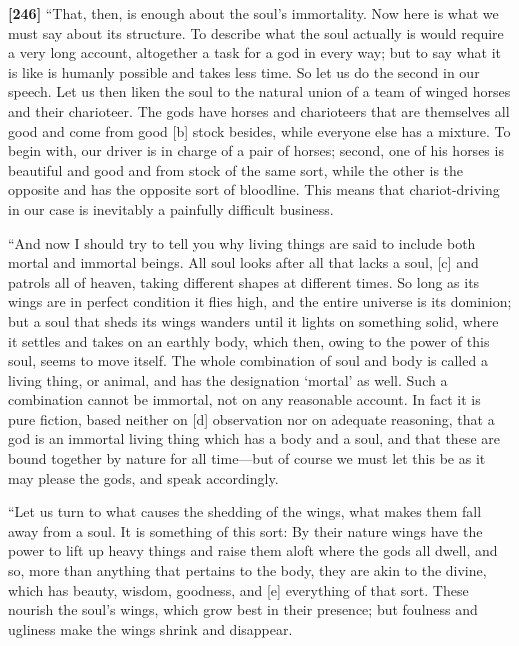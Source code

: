 {\bf {[}246{]}} “That, then, is enough about the soul's immortality. Now
here is what we must say about its structure. To describe what the soul
actually is would require a very long account, altogether a task for a
god in every way; but to say what it is like is humanly possible and
takes less time. So let us do the second in our speech. Let us then
liken the soul to the natural union of a team of winged horses and their
charioteer. The gods have horses and charioteers that are themselves all
good and come from good {[}b{]} stock besides, while everyone else has a
mixture. To begin with, our driver is in charge of a pair of horses;
second, one of his horses is beautiful and good and from stock of the
same sort, while the other is the opposite and has the opposite sort of
bloodline. This means that chariot-driving in our case is inevitably a
painfully difficult business.

“And now I should try to tell you why living things are said to include
both mortal and immortal beings. All soul looks after all that lacks a
soul, {[}c{]} and patrols all of heaven, taking different shapes at
different times. So long as its wings are in perfect condition it flies
high, and the entire universe is its dominion; but a soul that sheds its
wings wanders until it lights on something solid, where it settles and
takes on an earthly body, which then, owing to the power of this soul,
seems to move itself. The whole combination of soul and body is called a
living thing, or animal, and has the designation ‘mortal' as well. Such
a combination cannot be immortal, not on any reasonable account. In fact
it is pure fiction, based neither on {[}d{]} observation nor on adequate
reasoning, that a god is an immortal living thing which has a body and a
soul, and that these are bound together by nature for all time---but of
course we must let this be as it may please the gods, and speak
accordingly.

“Let us turn to what causes the shedding of the wings, what makes them
fall away from a soul. It is something of this sort: By their nature
wings have the power to lift up heavy things and raise them aloft where
the gods all dwell, and so, more than anything that pertains to the
body, they are akin to the divine, which has beauty, wisdom, goodness,
and {[}e{]} everything of that sort. These nourish the soul's wings,
which grow best in their presence; but foulness and ugliness make the
wings shrink and disappear.

